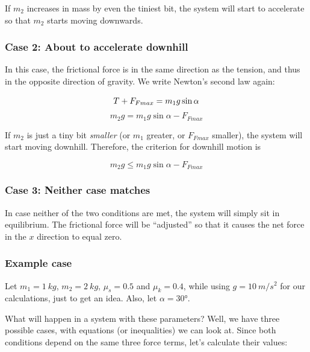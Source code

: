 \documentclass[8.01x]{subfiles}
\begin{document}
If $m_2$ increases in mass by even the tiniest bit, the system will start to accelerate so that $m_2$ starts moving downwards.

\subsubsection{Case 2: About to accelerate downhill}

In this case, the frictional force is in the same direction as the tension, and thus in the opposite direction of gravity. We write Newton's second law again:

\begin{equation}
T + F_{Fmax} = m_1 g \sin \alpha\\
\end{equation}
\begin{equation}
m_2 g = m_1 g \sin \alpha - F_{Fmax}
\end{equation}

If $m_2$ is just a tiny bit \emph{smaller} (or $m_1$ greater, or $F_{Fmax}$ smaller), the system will start moving downhill. Therefore, the criterion for downhill motion is

\begin{equation}
m_2 g \le m_1 g \sin \alpha - F_{Fmax}
\end{equation}

\subsubsection{Case 3: Neither case matches}

In case neither of the two conditions are met, the system will simply sit in equilibrium. The frictional force will be ``adjusted'' so that it causes the net force in the $x$ direction to equal zero.

\subsubsection{Example case}

Let $m_1 = \SI{1}{kg}$, $m_2 = \SI{2}{kg}$, $\mu_s = 0.5$ and $\mu_k = 0.4$, while using $g = \SI{10}{m/s^2}$ for our calculations, just to get an idea. Also, let $\alpha = \ang{30}$.

What will happen in a system with these parameters? Well, we have three possible cases, with equations (or inequalities) we can look at. Since both conditions depend on the same three force terms, let's calculate their values:
\end{document}
